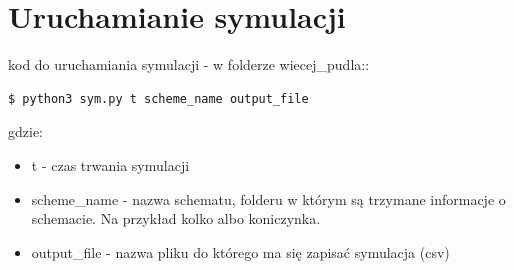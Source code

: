 \documentclass{article}
\begin{document}
\section{Uruchamianie symulacji}
\noindent kod do uruchamiania symulacji - w folderze wiecej\_pudla::
\begin{lstlisting}[language=bash]
  $ python3 sym.py t scheme_name output_file 
\end{lstlisting}
gdzie: \begin{itemize}
\item t - czas trwania symulacji
\item scheme\_name - nazwa schematu, folderu w którym są trzymane informacje o schemacie. Na przykład kolko albo koniczynka.
\item output\_file - nazwa pliku do którego ma się zapisać symulacja (csv)
\end{itemize}
\end{document}
